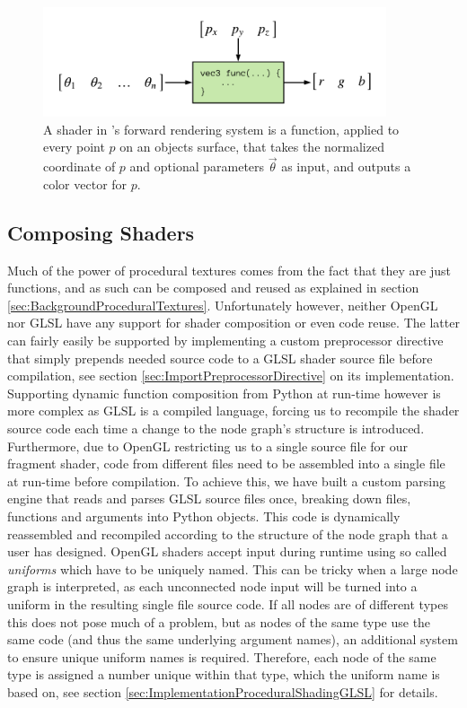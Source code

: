 \begin{figure}
    \centering
    \includegraphics[width=0.9\textwidth]{img/method/Shader Diagram.pdf}
    \caption{A shader in \dipter{}'s forward rendering system is a function, applied to every point $p$ on an objects surface, that takes the normalized coordinate of $p$ and optional parameters $\Vec{\theta}$ as input, and outputs a color vector for $p$.}
    \label{fig:OpenGLShader}
\end{figure}


\subsection{Composing Shaders}\label{sec:MethodComposingShaders}

Much of the power of procedural textures comes from the fact that they are just functions, and as such can be composed and reused as explained in section \ref{sec:BackgroundProceduralTextures}. Unfortunately however, neither OpenGL nor GLSL have any support for shader composition or even code reuse. The latter can fairly easily be supported by implementing a custom preprocessor directive that simply prepends needed source code to a GLSL shader source file before compilation, see section \ref{sec:ImportPreprocessorDirective} on its implementation. Supporting dynamic function composition from Python at run-time however is more complex as GLSL is a compiled language, forcing us to recompile the shader source code each time a change to the node graph's structure is introduced. Furthermore, due to OpenGL restricting us to a single source file for our fragment shader, code from different files need to be assembled into a single file at run-time before compilation. To achieve this, we have built a custom parsing engine that reads and parses GLSL source files once, breaking down files, functions and arguments into Python objects. This code is dynamically reassembled and recompiled according to the structure of the node graph that a user has designed. OpenGL shaders accept input during runtime using so called \textit{uniforms} which have to be uniquely named. This can be tricky when a large node graph is interpreted, as each unconnected node input will be turned into a uniform in the resulting single file source code. If all nodes are of different types this does not pose much of a problem, but as nodes of the same type use the same code (and thus the same underlying argument names), an additional system to ensure unique uniform names is required. Therefore, each node of the same type is assigned a number unique within that type, which the uniform name is based on, see section \ref{sec:ImplementationProceduralShadingGLSL} for details.


